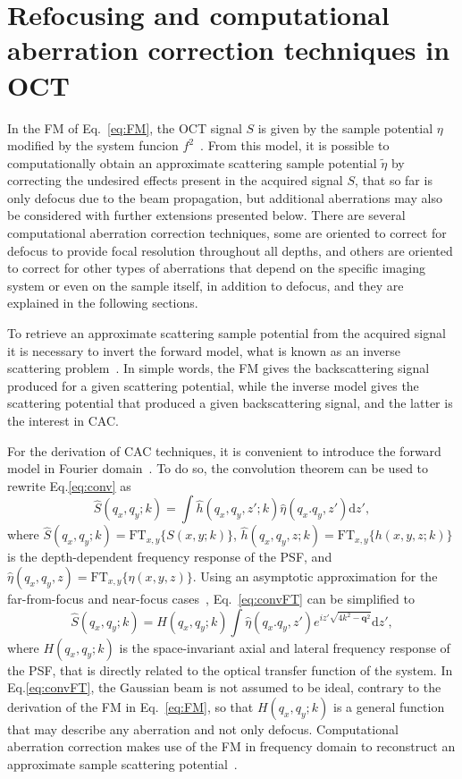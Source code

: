 \section{Refocusing and computational aberration correction techniques in OCT}\label{CAC}

In the FM of Eq.~\ref{eq:FM}, the OCT signal $S$ is given by the sample potential $\eta$ modified by the system funcion $f^2$~\cite{Marks2006_Inverse}. From this model, it is possible to computationally obtain an approximate scattering sample potential $\tilde{\eta}$ by correcting the undesired effects present in the acquired signal $S$, that so far is only defocus due to the beam propagation, but additional aberrations may also be considered with further extensions presented below. There are several computational aberration correction techniques, some are oriented to correct for defocus to provide focal resolution throughout all depths, and others are oriented to correct for other types of aberrations that depend on the specific imaging system or even on the sample itself, in addition to defocus, and they are explained in the following sections.

To retrieve an approximate scattering sample potential from the acquired signal it is necessary to invert the forward model, what is known as an inverse scattering problem~\cite{Ralston2006_Interferometric}. In simple words, the FM gives the backscattering signal produced for a given scattering potential, while the inverse model gives the scattering potential that produced a given backscattering signal, and the latter is the interest in CAC.

For the derivation of CAC techniques, it is convenient to introduce the forward model in Fourier domain~\cite{Liu2017_Computational}. To do so, the convolution theorem can be used to rewrite Eq.\eqref{eq:conv} as
\begin{equation}\label{eq:convFT}
    \hat{S}(q_x, q_y; k) = \int \hat{h}(q_x, q_y, z'; k) \hat{\eta}(q_x. q_y, z') \text{d}z',
\end{equation}
where $\hat{S}(q_x, q_y; k)=\text{FT}_{x,y}\{S(x,y;k)\}$, $\hat{h}(q_x, q_y, z; k)=\text{FT}_{x,y}\{h(x,y,z;k)\}$ is the depth-dependent frequency response of the PSF, and $\hat{\eta}(q_x, q_y, z)=\text{FT}_{x,y}\{\eta(x,y,z)\}$. Using an asymptotic approximation for the far-from-focus and near-focus cases~\cite{Davis2007_Nonparaxial}, Eq.~\eqref{eq:convFT} can be simplified to
\begin{equation}\label{eq:FMft}
    \hat{S}(q_x, q_y; k) = H(q_x, q_y; k) \int \hat{\eta}(q_x. q_y, z') e^{iz'\sqrt{4k^2-\mathbf{q}^2}} \text{d}z',
\end{equation}
where $H(q_x, q_y; k)$ is the space-invariant axial and lateral frequency response of the PSF, that is directly related to the optical transfer function of the system. In Eq.\eqref{eq:convFT}, the Gaussian beam is not assumed to be ideal, contrary to the derivation of the FM in Eq.~\eqref{eq:FM}, so that $H(q_x, q_y; k)$ is a general function that may describe any aberration and not only defocus. Computational aberration correction makes use of the FM in frequency domain to reconstruct an approximate sample scattering potential~\cite{Liu2017_Computational}.

